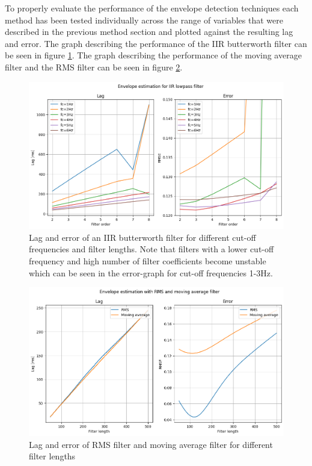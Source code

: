 To properly evaluate the performance of the envelope detection techniques each method has been tested individually across the range of variables that were described in the previous method section and plotted against the resulting lag and error. The graph describing the performance of the IIR butterworth filter can be seen in figure \ref{fig:lagerror_iir}. The graph describing the performance of the moving average filter and the RMS filter can be seen in figure \ref{fig:lagerror_RMS_MA}.

\begin{figure}[h!t]
	\begin{center}
		\includegraphics[width=1.0\columnwidth]{images/lagerror_iirfilter.png}
	\end{center}
	\caption{Lag and error of an IIR butterworth filter for different cut-off frequencies and filter lengths. Note that filters with a lower cut-off frequency and high number of filter coefficients become unstable which can be seen in the error-graph for cut-off frequencies 1-3Hz.}
	\label{fig:lagerror_iir}
\end{figure}

\begin{figure}[h!t]
	\begin{center}
		\includegraphics[width=1.0\columnwidth]{images/lagerror_rms_and_MA_filter.png}
	\end{center}
	\caption{Lag and error of RMS filter and moving average filter for different filter lengths}
	\label{fig:lagerror_RMS_MA}
\end{figure}

